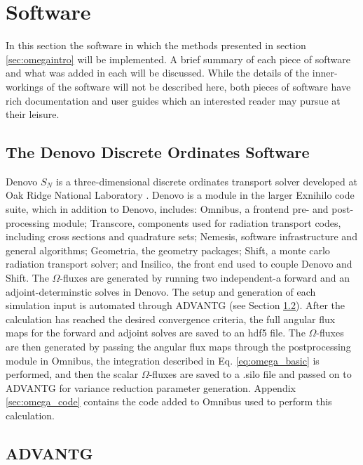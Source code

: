 \section{Software}
\label{sec:software}

In this section the software in which the methods presented in section
\ref{sec:omegaintro} will be implemented. A brief summary of each piece of
software and what was added in each will be discussed.
While the details of the inner-workings of the software will not be described
here, both pieces of software have rich documentation and user guides which an
interested reader may pursue at their leisure.

\subsection{The Denovo Discrete Ordinates Software}

Denovo $S_N$ is a three-dimensional discrete ordinates transport solver
developed at Oak Ridge National Laboratory \cite{evans_denovo:_2010}. Denovo is a module in the larger
Exnihilo code suite, which in addition to Denovo,
includes: Omnibus, a frontend pre- and post-processing module; Transcore,
components used for radiation transport codes, including cross sections and
quadrature sets; Nemesis, software infrastructure and general algorithms;
Geometria, the geometry packages; Shift, a monte carlo radiation transport
solver; and Insilico, the front end used to couple Denovo and Shift. The
$\Omega$-fluxes are generated by running two independent-a forward and an
adjoint-determinstic solves in Denovo. The setup and generation of each
simulation input is automated through ADVANTG (see Section \ref{sec:advantg}).
After the calculation has reached the desired convergence criteria, the
full angular flux maps for the
forward and adjoint solves are saved to an hdf5 \cite{hdf5} file. The
$\Omega$-fluxes are then generated by passing the angular flux maps through the
postprocessing module in Omnibus, the integration described in Eq.
\ref{eq:omega_basic} is performed, and then the scalar $\Omega$-fluxes are saved
to a .silo file and passed on to ADVANTG for variance reduction parameter
generation. Appendix \ref{sec:omega_code} contains the code added to Omnibus
used to perform this calculation.

\subsection{ADVANTG}
\label{sec:advantg}

